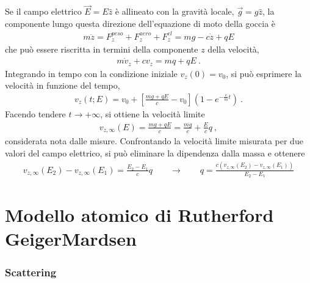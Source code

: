\documentclass[letterpaper,10pt,italian]{jupyterBook}
\begin{document}
\sphinxAtStartPar
Se il campo elettrico \(\vec{E} = E \hat{z}\) è allineato con la gravità locale, \(\vec{g} = g \hat{z}\), la componente lungo questa direzione dell’equazione di moto della goccia è
\begin{equation*}
\begin{split}m \ddot{z} = F^{peso}_z + F^{aero}_z + F^{el}_z = m g - c \dot{z} + q E\end{split}
\end{equation*}
\sphinxAtStartPar
che può essere riscritta in termini della componente \(z\) della velocità,
\begin{equation*}
\begin{split}m \dot{v}_z + c v_z = m q + q E \ .\end{split}
\end{equation*}
\sphinxAtStartPar
Integrando in tempo con la condizione iniziale \(v_z(0) = v_0\), si può esprimere la velocità in funzione del tempo,
\begin{equation*}
\begin{split}v_z(t; E) = v_0 + \left[ \frac{m g + q E}{c} - v_0 \right] (1 - e^{-\frac{c}{m}t}) \ .\end{split}
\end{equation*}
\sphinxAtStartPar
Facendo tendere \(t \rightarrow +\infty\), si ottiene la velocità limite
\begin{equation*}
\begin{split}v_{z, \infty}(E) = \frac{m g + q E}{c} = \frac{m g}{c} + \frac{E}{c} q \ ,\end{split}
\end{equation*}
\sphinxAtStartPar
considerata nota dalle misure. Confrontando la velocità limite misurata per due valori del campo elettrico, si può eliminare la dipendenza dalla massa e ottenere
\begin{equation*}
\begin{split}v_{z, \infty}(E_2) - v_{z, \infty}(E_1) = \frac{E_2 - E_1}{c} q \qquad \rightarrow \qquad q = \frac{c \left(v_{z,\infty}(E_2)- v_{z,\infty}(E_1) \right)}{E_2 - E_1}\end{split}
\end{equation*}

\section{Modello atomico di Rutherford \sphinxhyphen{} Geiger\sphinxhyphen{}Mardsen}
\label{\detokenize{ch/modern/experiments:modello-atomico-di-rutherford-geiger-mardsen}}\subsubsection*{Scattering}
\end{document}
